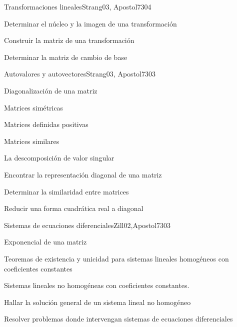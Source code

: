\begin{syllabus}
\begin{unit}{Transformaciones lineales}{}{Strang03, Apostol73}{0}{4}
   \begin{learningoutcomes}
      \item Determinar el núcleo y la imagen de una transformación
      \item Construir la matriz de una transformación
      \item Determinar la matriz de cambio de base
      \end{learningoutcomes}
\end{unit}

\begin{unit}{Autovalores y autovectores}{}{Strang03, Apostol73}{0}{3}
\begin{topics}
      \item Diagonalización de una matriz
      \item Matrices simétricas
      \item Matrices definidas positivas
      \item Matrices similares
      \item La descomposición de valor singular
  \end{topics}

   \begin{learningoutcomes}
      \item Encontrar la representación diagonal de una matriz
      \item Determinar la similaridad entre matrices
      \item Reducir una forma cuadrática real a diagonal
   \end{learningoutcomes}
\end{unit}

\begin{unit}{Sistemas de ecuaciones diferenciales}{}{Zill02,Apostol73}{0}{3}
\begin{topics}
      \item Exponencial de una matriz
      \item Teoremas de existencia y unicidad para sistemas lineales homogéneos con coeficientes constantes
      \item Sistemas lineales no homogéneas con coeficientes constantes.
    \end{topics}

   \begin{learningoutcomes}
      \item Hallar la solución general de un sistema lineal no  homogéneo
      \item Resolver problemas donde intervengan sistemas de ecuaciones diferenciales
   \end{learningoutcomes}
\end{unit}


\end{syllabus}
